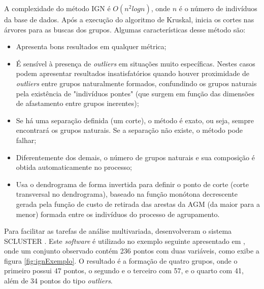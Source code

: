 A complexidade do método IGN é ${O(n^2 log n)}$, onde ${n}$ é o número de indivíduos da base de dados. Após a execução do algoritmo de Kruskal, inicia os cortes nas árvores para as buscas dos grupos.
Algumas características desse método são:
\begin{itemize}
\item Apresenta bons resultados em qualquer métrica;
\item É sensível à presença de \emph{outliers} em situações muito específicas. Nestes casos podem apresentar resultados insatisfatórios quando houver proximidade de \emph{outliers} entre grupos naturalmente formados, confundindo os grupos naturais pela existência de "indivíduos pontes" (que surgem em função das dimensões de afastamento entre grupos inerentes);
\item Se há uma separação definida (um corte), o método é exato, ou seja, sempre encontrará os grupos naturais. Se a separação não existe, o método pode falhar;
\item Diferentemente dos demais, o número de grupos naturais e sua composição é obtida automaticamente no processo;
\item Usa o dendrograma de forma invertida para definir o ponto de corte (corte transversal no dendrograma), baseado na função monótona decrescente gerada pela função de custo de retirada das arestas da AGM (da maior para a menor) formada entre os indivíduos do processo de agrupamento.
\end{itemize}

Para facilitar as tarefas de análise multivariada, \cite{ign} desenvolveram o sistema SCLUSTER \cite{scluster}. Este \textit{software} é utilizado no exemplo seguinte apresentado em \cite{devillez}, onde um conjunto observado contém 236 pontos com duas variáveis, como exibe a figura \ref{fig:ignExemplo}. O resultado é a formação de quatro grupos, onde o primeiro possui 47 pontos, o segundo e o terceiro com 57, e o quarto com 41, além de 34 pontos do tipo \textit{outliers}.

\begin{figure}[!ht]
	\centering
\end{figure}

